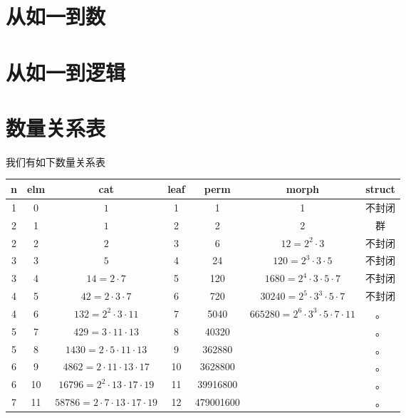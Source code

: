 \documentclass[a4paper,12pt]{article}
\numberwithin{definition}{section}
\numberwithin{lemma}{section}
\numberwithin{proposition}{section}
\numberwithin{theorem}{section}
\numberwithin{grammar}{section}
\numberwithin{program}{section}
\numberwithin{convention}{section}
\numberwithin{corollary}{section}
\numberwithin{principle}{section}
\begin{document}
\section{从如一到数}


\section{从如一到逻辑}



\newpage

\appendix
\newpage

\section{数量关系表}

我们有如下数量关系表

\begin{table}[]
\begin{tabular}{|c|c|c|c|c|c|c|}
\hline
 n & elm &  cat     & leaf & perm & morph & struct \\ \hline
   1 &  0  &    $1$     &  1   &  1 & 1 & 不封闭   \\ \hline
   2 &  1  &    $1$     &  2   &  2 & 2 & 群 \\ \hline
   2 &  2  &    $2$     &  3   &  6 & $12 = 2^2 \cdot 3$ & 不封闭 \\ \hline
   3 &  3  &    $5$     &  4   &  24 & $120 = 2^3 \cdot 3 \cdot 5$ & 不封闭 \\ \hline
   3 &  4  &   $14 = 2 \cdot 7$ &  5   &  120 & $1680 = 2^4 \cdot 3 \cdot 5 \cdot 7$ & 不封闭  \\ \hline
   4 &  5  &   $42 = 2 \cdot 3 \cdot 7$ &  6   &  720 & $30240 = 2^5 \cdot 3^3 \cdot 5 \cdot 7 $ & 不封闭 \\ \hline
   4 &  6  &  $132 = 2^2 \cdot 3 \cdot 11$ &  7   &  5040 & $665280 = 2^6 \cdot 3^3 \cdot 5 \cdot 7 \cdot 11 $ & 。   \\ \hline
   5 &  7  &  $429 = 3 \cdot 11 \cdot 13$ &  8   &  40320 & & 。   \\ \hline
   5 &  8  & $1430 = 2 \cdot 5 \cdot 11 \cdot 13$ &  9   &  362880 & & 。   \\ \hline
   6 &  9  & $4862 = 2 \cdot 11 \cdot 13 \cdot 17$ &  10  & 3628800 & & 。   \\ \hline
   6 & 10  &$16796 = 2^2 \cdot 13 \cdot 17 \cdot 19$ &  11  & 39916800 & & 。   \\ \hline
   7 & 11  &$58786 = 2 \cdot 7 \cdot 13 \cdot 17 \cdot 19$ &  12  & 479001600 & & 。   \\ \hline
\end{tabular}
\end{table}
\end{document}

